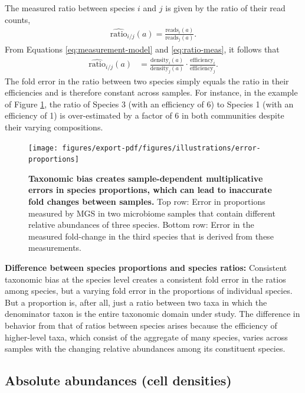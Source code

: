 \documentclass[
]{article}
\begin{document}
The measured ratio between species \(i\) and \(j\) is given by the ratio of their read counts,
\begin{align}
  \label{eq:ratio-meas}
  \widehat{\text{ratio}}_{i/j}(a) = \frac{\text{reads}_i(a)}{\text{reads}_j(a)}.
\end{align}
From Equations \eqref{eq:measurement-model} and \eqref{eq:ratio-meas}, it follows that
\begin{align}
  \label{eq:ratio-error}
  \widehat{\text{ratio}}_{i/j}(a)
  &= \frac{\text{density}_{i}(a)}{\text{density}_{j}(a)} \cdot \frac{\text{efficiency}_{i}}{\text{efficiency}_{j}}.
\end{align}
The fold error in the ratio between two species simply equals the ratio in their efficiencies and is therefore constant across samples.
For instance, in the example of Figure \ref{fig:error-proportions}, the ratio of Species 3 (with an efficiency of 6) to Species 1 (with an efficiency of 1) is over-estimated by a factor of 6 in both communities despite their varying compositions.

\begin{figure}
\texttt{[image: figures/export-pdf/figures/illustrations/error-proportions]} \caption{\textbf{Taxonomic bias creates sample-dependent multiplicative errors in species proportions, which can lead to inaccurate fold changes between samples.} Top row: Error in proportions measured by MGS in two microbiome samples that contain different relative abundances of three species. Bottom row: Error in the measured fold-change in the third species that is derived from these measurements.}\label{fig:error-proportions}
\end{figure}



\textbf{Difference between species proportions and species ratios:}
Consistent taxonomic bias at the species level creates a consistent fold error in the ratios among species, but a varying fold error in the proportions of individual species.
But a proportion is, after all, just a ratio between two taxa in which the denominator taxon is the entire taxonomic domain under study.
The difference in behavior from that of ratios between species arises because the efficiency of higher-level taxa, which consist of the aggregate of many species, varies across samples with the changing relative abundances among its constituent species.

\hypertarget{absolute-abundances-cell-densities}{%
\subsection{Absolute abundances (cell densities)}\label{absolute-abundances-cell-densities}}
\end{document}
